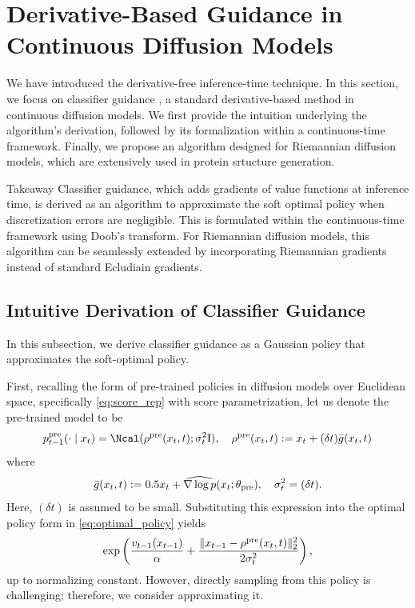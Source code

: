 \section{Derivative-Based Guidance in Continuous Diffusion Models}\label{sec:derivative}

We have introduced the derivative-free inference-time technique. In this section, we focus on classifier guidance \citep{dhariwal2021diffusion,song2021score}, a standard derivative-based method in continuous diffusion models. We first provide the intuition underlying the algorithm's derivation, followed by its formalization within a continuous-time framework. Finally, we propose an algorithm designed for Riemannian diffusion models, which are extensively used in protein srtucture generation.

{\newedit \begin{AIbox}{Takeaway}
Classifier guidance, which adds gradients of value functions at inference time, is derived as an algorithm to approximate the soft optimal policy when discretization errors are negligible. This is formulated within the continuous-time framework using Doob's transform. For Riemannian diffusion models, this algorithm can be seamlessly extended by incorporating Riemannian gradients instead of standard Ecludiain gradients.
\end{AIbox}
} 

\subsection{Intuitive Derivation of Classifier Guidance} \label{sec:intuition}

In this subsection, we derive classifier guidance as a Gaussian policy that approximates the soft-optimal policy. 

First, recalling the form of pre-trained policies in diffusion models over Euclidean space, specifically
\eqref{eq:score_rep} with score parametrization, let us denote the pre-trained model to be $$
p^{\pre}_{t-1}(\cdot \mid x_t) = \Ncal( \rho^{\pre}(x_t,t)  ;\sigma^2_t \rI),\quad \rho^{\pre}(x_t,t) := x_t + (\delta t) \bar g(x_t,t)
$$ 
where
\begin{align*}
  \bar g(x_t,t):=  0.5 x_t  + \widehat{\nabla \log p}(x_t;\theta_{\mathrm{pre}}),\quad \sigma^2_t=(\delta t). 
\end{align*}
Here, $(\delta t)$ is assumed to be small. { Substituting this expression into the optimal policy form in \eqref{eq:optimal_policy} yields } 
\begin{align}\label{eq:original_before}
  \exp\left (\frac{v_{t-1}(x_{t-1})}{\alpha} + \frac{\|x_{t-1}-\rho^{\mathrm{pre}}(x_t,t)\|^2_2}{2\sigma^2_t} \right),      
\end{align}
up to normalizing constant. {However, directly sampling from this policy is challenging; therefore, we consider approximating it.  } 


